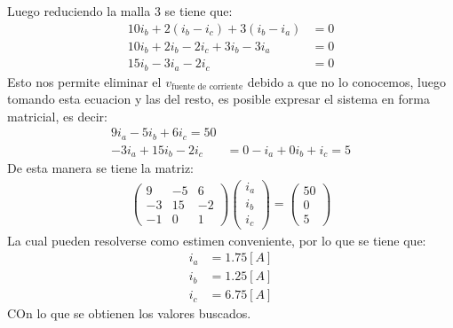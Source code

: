 \documentclass[
  11pt,
  letterpaper,
   addpoints,
   answers
  ]{exam}
\begin{document}
\begin{questions}
\begin{solution}
    Luego reduciendo la malla 3 se tiene que:
    \begin{align}
        10i_{b} + 2(i_{b} -i_{c}) + 3(i_{b} -i_{a}) &= 0\\
        10i_{b} + 2i_{b} - 2i_{c} + 3i_{b} - 3i_{a} &= 0\\
        15i_{b} - 3i_{a} - 2i_{c} &= 0
    \end{align}
    Esto nos permite eliminar el $v_{\text{fuente de corriente}}$ debido a que no lo conocemos, luego tomando esta ecuacion y las del resto, es posible expresar el sistema en forma matricial, es decir:
    \begin{align}
       9i_{a} - 5i_{b} + 6i_{c} = 50\\
       - 3i_{a} +15i_{b}- 2i_{c} &= 0
       -i_{a} + 0i_{b} + i_{c}  = 5
    \end{align}
    De esta manera se tiene la matriz:
    \begin{align}
        \begin{pmatrix}
            9 & -5 & 6 \\
            -3 & 15 & -2 \\
            -1 & 0 & 1
        \end{pmatrix}
        \begin{pmatrix}
            i_{a} \\
            i_{b} \\
            i_{c}
        \end{pmatrix} = 
        \begin{pmatrix}
            50 \\
            0 \\
            5
        \end{pmatrix}
    \end{align}
    La cual pueden resolverse como estimen conveniente, por lo que se tiene que:
    \begin{align}
        i_{a} &= 1.75[A] \\
        i_{b} &= 1.25[A] \\
        i_{c} &= 6.75[A]
    \end{align}
    COn lo que se obtienen los valores buscados.
\end{solution}
\end{questions}
\end{document}
